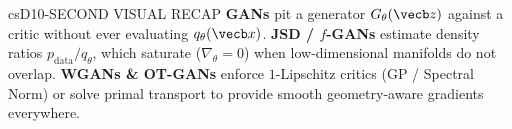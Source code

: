 \documentclass[../../../../master.tex]{subfiles}
\begin{document}
\begin{cscolumns}
\begin{cscard}{csD}{10-SECOND VISUAL RECAP}
  \sffamily\footnotesize
  \textbf{GANs} pit a generator $G_\theta(\vecb z)$ against a critic without ever evaluating $q_\theta(\vecb x)$.
  \textbf{JSD / $f$-GANs} estimate density ratios $p_{\mathrm{data}}/q_\theta$, which saturate ($\nabla_\theta=0$) when low-dimensional manifolds do not overlap.
  \textbf{WGANs \& OT-GANs} enforce $1$-Lipschitz critics (GP / Spectral Norm) or solve primal transport to provide smooth geometry-aware gradients everywhere.
\end{cscard}
\end{cscolumns}

\csend
\end{document}
